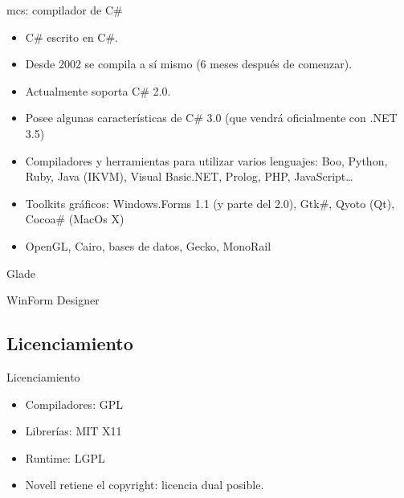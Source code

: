 \documentclass{beamer}
\begin{document}
\begin{frame}{mcs: compilador de C\#}
  \begin{itemize}
    \item C\# escrito en C\#.
    \item Desde 2002 se compila a sí mismo (6 meses después de comenzar).
    \item Actualmente soporta C\# 2.0.
    \item Posee algunas características de C\# 3.0 (que vendrá oficialmente con .NET 3.5)
  \end{itemize}
\end{frame}

\begin{frame}
  \begin{itemize}
    \item Compiladores y herramientas para utilizar varios lenguajes: Boo,
      Python, Ruby, Java (IKVM), Visual Basic.NET, Prolog, PHP, JavaScript\ldots
    \item Toolkits gráficos: Windows.Forms 1.1 (y parte del 2.0), Gtk\#, Qyoto (Qt), Cocoa\# (MacOs X)
    \item OpenGL, Cairo, bases de datos, Gecko, MonoRail
  \end{itemize}
\end{frame}

\begin{frame}[plain]{Glade}
  \begin{centering}
  \end{centering}
\end{frame}

\begin{frame}[plain]{WinForm Designer}
  \begin{centering}
  \end{centering}
\end{frame}


\subsection{Licenciamiento}

\begin{frame}{Licenciamiento}
  \begin{itemize}
    \item Compiladores: GPL
    \item Librerías: MIT X11
    \item Runtime: LGPL
    \item Novell retiene el copyright: licencia dual posible.
  \end{itemize}
\end{frame}
\end{document}
